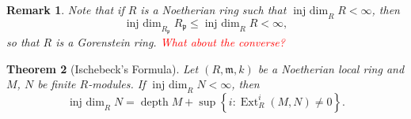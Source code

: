 \documentclass[10pt]{article}
\theoremstyle{thmstyle}
\newtheorem{theorem}{Theorem}[section]
\theoremstyle{defstyle}
\newtheorem{remark}[theorem]{Remark}
\newcommand{\frakm}{\mathfrak{m}} %
\newcommand{\frakp}{\mathfrak{p}} %
\renewcommand{\le}{\leqslant}
\newcommand{\Ext}{\operatorname{Ext}}
\newcommand{\injdim}{\operatorname{inj~dim}}
\newcommand{\depth}{\operatorname{depth}}
\begin{document}
\begin{remark}
    Note that if $R$ is a Noetherian ring such that $\injdim_R R < \infty$, then 
    \begin{equation*}
        \injdim_{R_\frakp} R_\frakp\le\injdim_R R < \infty,
    \end{equation*}
    so that $R$ is a Gorenstein ring. \textcolor{red}{What about the converse?}
\end{remark}

\begin{theorem}[Ischebeck's Formula]
    Let $(R,\frakm, k)$ be a Noetherian local ring and $M$, $N$ be finite $R$-modules. If $\injdim_R N < \infty$, then 
    \begin{equation*}
        \injdim_R N = \depth M + \sup\left\{i\colon\Ext^i_R(M, N)\ne 0\right\}.
    \end{equation*}
\end{theorem}
\end{document}
